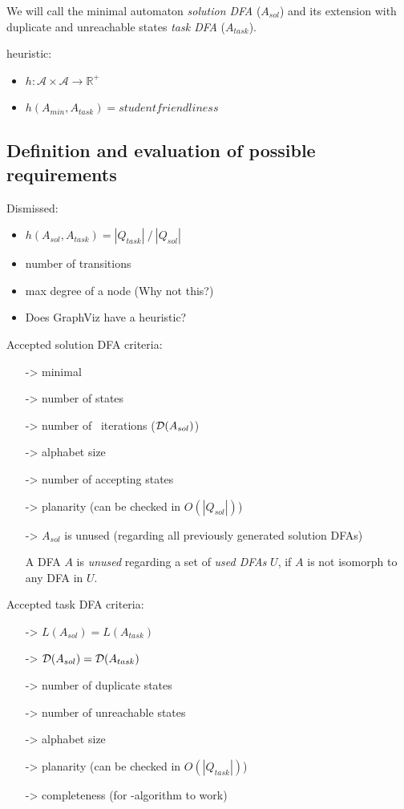 We will call the minimal automaton \emph{solution DFA} ($A_{sol}$) and its extension with duplicate and unreachable states \emph{task DFA} ($A_{task}$).

heuristic:
\begin{itemize}
	\item $h \colon \mathcal{A} \times \mathcal{A} \to \mathbb{R^+}$
	\item $h(A_{min}, A_{task}) = studentfriendliness$
\end{itemize}

\subsection{Definition and evaluation of possible requirements}

\label{ch:1:determined-requirements}
Dismissed:
\begin{itemize}
	\item $h(A_{sol}, A_{task}) = |Q_{task}|\ /\ |Q_{sol}|$
	\item number of transitions
	\item max degree of a node (Why not this?)
	\item Does GraphViz have a heuristic?
\end{itemize}
Accepted solution DFA criteria:
\begin{itemize}
	\item[->] minimal
	\item[->] number of states
	\item[->] number of \MinMark\ iterations ($\mathcal{D}(A_{sol})$)
	\item[->] alphabet size
	\item[->] number of accepting states
	\item[->] planarity (can be checked in $O(|Q_{sol}|)$)
	\item[->] $A_{sol}$ is unused (regarding all previously generated solution DFAs)
	
	\begin{definition} \label{ch:1:unused-dfa}
		A DFA $A$ is \emph{unused} regarding a set of \emph{used DFAs} $U$, if $A$ is not isomorph to any DFA in $U$.
	\end{definition}
\end{itemize}
Accepted task DFA criteria:
\begin{itemize}
	\item[->] $L(A_{sol}) = L(A_{task})$
	\item[->] $\mathcal{D}(A_{sol}) = \mathcal{D}(A_{task})$
	\item[->] number of duplicate states
	\item[->] number of unreachable states
	\item[->] alphabet size
	\item[->] planarity (can be checked in $O(|Q_{task}|)$)
	\item[->] completeness (for \MinMark-algorithm to work)
\end{itemize}

